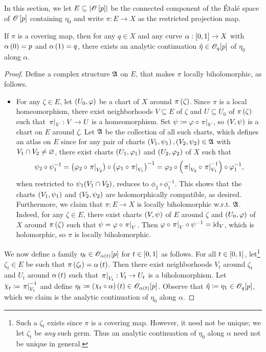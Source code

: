\documentclass[../Moduli_Spaces_of_Riemann_Surfaces.tex]{subfiles}
\begin{document}
    In this section, we let $E\subseteq\l|\HOLO\l[p\r]\r|$ be the connected component of the Étalé space of $\HOLO\l[p\r]$ containing $\eta_0$ and write $\pi:E\to X$ as the restricted projection map.
    \begin{theorem}\label{A:thm:existence_of_analytic_continuation}
        If $\pi$ is a covering map, then for any $q\in X$ and any curve $\alpha:\l[0,1\r]\to X$ with $\alpha\l(0\r)=p$ and $\alpha\l(1\r)=q$, there exists an analytic continuation $\hat{\eta}\in\HOLO_q\!\l[p\r]$ of $\eta_0$ along $\alpha$.
    \end{theorem}
    \begin{proof}
        Define a complex structure $\mf{A}$ on $E$, that makes $\pi$ locally biholomorphic, as follows.
        \begin{itemize}
            \item For any $\zeta\in E$, let $\tpl{U_0,\phi}$ be a chart of $X$ around $\pi\l(\zeta\r)$. Since $\pi$ is a local homeomorphism, there exist neighborhoods $V\subseteq E$ of $\zeta$ and $U\subseteq U_0$ of $\pi\l(\zeta\r)$ such that $\l.\pi\r|_V:V\to U$ is a homeomorphism. Set $\psi\coloneqq\phi\circ\l.\pi\r|_V$, so $\tpl{V,\psi}$ is a chart on $E$ around $\zeta$. Let $\mf{A}$ be the collection of all such charts, which defines an atlas on $E$ since for any pair of charts $\tpl{V_1,\psi_1},\tpl{V_2,\psi_2}\in\mf{A}$ with $V_1\cap V_2\neq\em$, there exist charts $\tpl{U_1,\phi_1}$ and $\tpl{U_2,\phi_2}$ of $X$ such that
                \begin{equation*}
                    \psi_2\circ\psi_1^{-1}=\l(\phi_2\circ\l.\pi\r|_{V_2}\r)\circ\l(\phi_1\circ\l.\pi\r|_{V_1}\r)^{-1}=\phi_2\circ\l(\l.\pi\r|_{V_2}\circ\l.\pi\r|_{V_1}^{-1}\r)\circ\phi_1^{-1},
                \end{equation*}
                when restricted to $\psi_1\!\l(V_1\cap V_2\r)$, reduces to $\phi_2\circ\phi_1^{-1}$. This shows that the charts $\tpl{V_1,\psi_1}$ and $\tpl{V_2,\psi_2}$ are holomorphically compatible, as desired. Furthermore, we claim that $\pi:E\to X$ is locally biholomorphic w.r.t. $\mf{A}$. Indeed, for any $\zeta\in E$, there exist charts $\tpl{V,\psi}$ of $E$ around $\zeta$ and $\tpl{U_0,\phi}$ of $X$ around $\pi\l(\zeta\r)$ such that $\psi=\phi\circ\l.\pi\r|_V$. Then $\phi\circ\l.\pi\r|_V\circ\psi^{-1}=\id_V$, which is holomorphic, so $\pi$ is locally biholomorphic.
        \end{itemize}
        We now define a family $\eta_t\in\HOLO_{\alpha\l(t\r)}\!\l[p\r]$ for $t\in\l[0,1\r]$ as follows. For all $t\in\l[0,1\r]$, let\footnote{Such a $\zeta_t$ exists since $\pi$ is a covering map. However, it need not be unique; we let $\zeta_t$ be \textit{any} such germ. Thus an analytic continuation of $\eta_0$ along $\alpha$ need not be unique in general.} $\zeta_t\in E$ be such that $\pi\l(\zeta_t\r)=\alpha\l(t\r)$. Then there exist neighborhoods $V_t$ around $\zeta_t$ and $U_t$ around $\alpha\l(t\r)$ such that $\l.\pi\r|_{V_t}:V_t\to U_t$ is a biholomorphism. Let $\cchi_t\coloneqq\l.\pi\r|_{V_t}^{-1}$ and define $\eta_t\coloneqq\l(\cchi_t\circ\alpha\r)\l(t\r)\in\HOLO_{\alpha\l(t\r)}\!\l[p\r]$. Observe that $\hat{\eta}\coloneqq\eta_1\in\HOLO_q\!\l[p\r]$, which we claim is the analytic continuation of $\eta_0$ along $\alpha$.

\end{proof}
\end{document}

